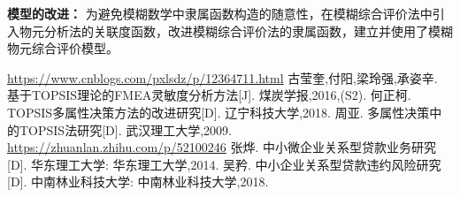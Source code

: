\documentclass{cumcmthesis}
\begin{document}
\textbf{模型的改进：}
为避免模糊数学中隶属函数构造的随意性，在模糊综合评价法中引入物元分析法的关联度函数，改进模糊综合评价法的隶属函数，建立并使用了模糊物元综合评价模型。


\begin{thebibliography}{9}%
     \url{https://www.cnblogs.com/pxlsdz/p/12364711.html}
    古莹奎,付阳,梁玲强,承姿辛. 基于TOPSIS理论的FMEA灵敏度分析方法[J]. 煤炭学报,2016,(S2).
    何正柯. TOPSIS多属性决策方法的改进研究[D]. 辽宁科技大学,2018.
    周亚. 多属性决策中的TOPSIS法研究[D]. 武汉理工大学,2009.
     \url{https://zhuanlan.zhihu.com/p/52100246}
    张烨. 中小微企业关系型贷款业务研究[D]. 华东理工大学: 华东理工大学,2014.
    吴矜. 中小企业关系型贷款违约风险研究[D]. 中南林业科技大学: 中南林业科技大学,2018.
\end{thebibliography}


\newpage
\end{document}
